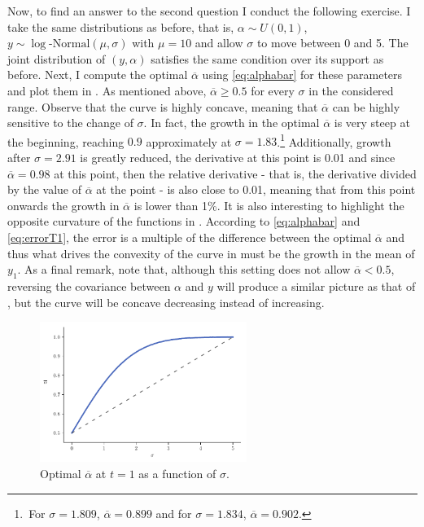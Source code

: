 \documentclass[english, a4paper,12pt]{article}
\begin{document}
Now, to find an answer to the second question I conduct the following exercise. I take the same distributions as before, that is, $\alpha \sim U(0,1)$, $y \sim \log\text{-Normal}(\mu, \sigma)$ with $\mu = 10$ and allow $\sigma$ to move between 0 and 5. The joint distribution of $(y,\alpha)$ satisfies the same condition over its support as before. Next, I compute the optimal $\overline{\alpha}$ using \eqref{eq:alphabar} for these parameters and plot them in . As mentioned above, $\overline{\alpha} \geq 0.5$ for every $\sigma$ in the considered range. Observe that the curve is highly concave, meaning that $\overline{\alpha}$ can be highly sensitive to the change of $\sigma$. In fact, the growth in the optimal $\overline{\alpha}$ is very steep at the beginning, reaching $0.9$ approximately at $\sigma = 1.83$.\footnote{\,For $\sigma = 1.809$, $\overline{\alpha} = 0.899$ and for $\sigma = 1.834$, $\overline{\alpha} = 0.902$.} Additionally, growth after $\sigma = 2.91$ is greatly reduced, the derivative at this point is 0.01 and since $\overline{\alpha} = 0.98$ at this point, then the relative derivative - that is, the derivative divided by the value of $\overline{\alpha}$ at the point - is also close to 0.01, meaning that from this point onwards the growth in $\overline{\alpha}$ is lower than 1\%.  It is also interesting to highlight the opposite curvature of the functions in . According to \eqref{eq:alphabar} and \eqref{eq:errorT1}, the error is a multiple of the difference between the optimal $\overline{\alpha}$ and thus what drives the convexity of the curve in  must be the growth in the mean of $y_{1}$. As a final remark, note that, although this setting does not allow $\overline{\alpha} < 0.5$, reversing the covariance between $\alpha$ and $y$ will produce a similar picture as that of , but the curve will be concave decreasing instead of increasing.    
	\begin{figure}[H] 
		\caption{Optimal $\overline{\alpha}$ at $t = 1$ as a function of $\sigma$.}
		\label{fig:RAoptimalAlphas}
		\includegraphics[width = 0.6\textwidth]{RAoptimalAlphas}
	\end{figure}
\end{document}
